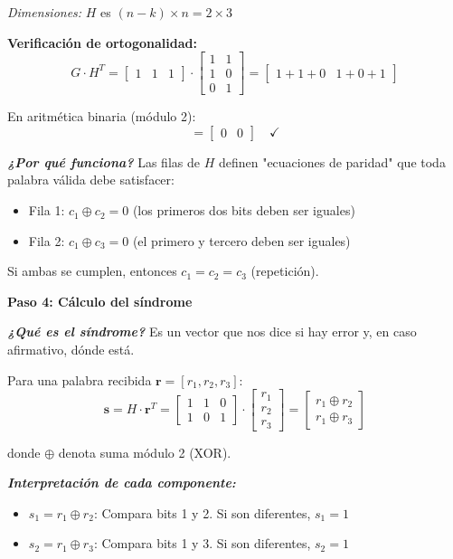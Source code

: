 \documentclass[11pt,a4paper]{article}
\begin{document}
\textit{Dimensiones:} $H$ es $(n-k) \times n = 2 \times 3$

\textbf{Verificaci\'on de ortogonalidad:}
\[
G \cdot H^T = \begin{bmatrix} 1 & 1 & 1 \end{bmatrix} \cdot \begin{bmatrix}
1 & 1 \\
1 & 0 \\
0 & 1
\end{bmatrix} = \begin{bmatrix} 1+1+0 & 1+0+1 \end{bmatrix}
\]

En aritm\'etica binaria (m\'odulo 2):
\[
= \begin{bmatrix} 0 & 0 \end{bmatrix} \quad \checkmark
\]

\textit{\textbf{¿Por qu\'e funciona?}} Las filas de $H$ definen "ecuaciones de paridad" que toda palabra v\'alida debe satisfacer:
\begin{itemize}
    \item Fila 1: $c_1 \oplus c_2 = 0$ (los primeros dos bits deben ser iguales)
    \item Fila 2: $c_1 \oplus c_3 = 0$ (el primero y tercero deben ser iguales)
\end{itemize}

Si ambas se cumplen, entonces $c_1 = c_2 = c_3$ (repetici\'on).

\textbf{Paso 4: C\'alculo del s\'indrome}

\textit{\textbf{¿Qu\'e es el s\'indrome?}} Es un vector que nos dice si hay error y, en caso afirmativo, d\'onde est\'a.

Para una palabra recibida $\mathbf{r} = [r_1, r_2, r_3]$:
\[
\mathbf{s} = H \cdot \mathbf{r}^T = \begin{bmatrix}
1 & 1 & 0 \\
1 & 0 & 1
\end{bmatrix} \cdot \begin{bmatrix}
r_1 \\
r_2 \\
r_3
\end{bmatrix} = \begin{bmatrix}
r_1 \oplus r_2 \\
r_1 \oplus r_3
\end{bmatrix}
\]

donde $\oplus$ denota suma m\'odulo 2 (XOR).

\textit{\textbf{Interpretaci\'on de cada componente:}}
\begin{itemize}
    \item $s_1 = r_1 \oplus r_2$: Compara bits 1 y 2. Si son diferentes, $s_1 = 1$
    \item $s_2 = r_1 \oplus r_3$: Compara bits 1 y 3. Si son diferentes, $s_2 = 1$
\end{itemize}
\end{document}
